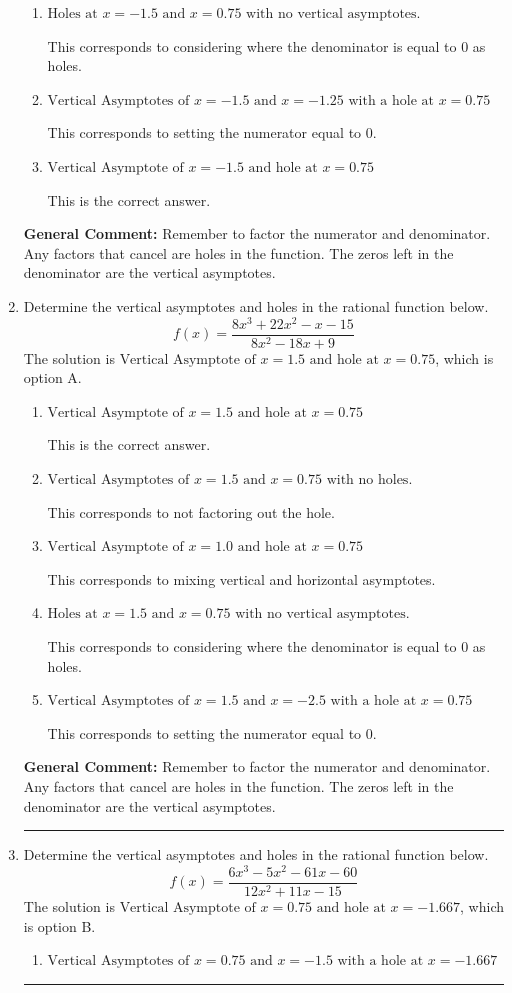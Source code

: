 \documentclass{extbook}[14pt]
\newcommand{\litem}[1]{\item #1

\rule{\textwidth}{0.4pt}}
\begin{document}
\begin{enumerate}
{\begin{enumerate}[label=\Alph*.]
This corresponds to mixing vertical and horizontal asymptotes.
\item \( \text{Holes at } x = -1.5 \text{ and } x = 0.75 \text{ with no vertical asymptotes.} \)

This corresponds to considering where the denominator is equal to 0 as holes.
\item \( \text{Vertical Asymptotes of } x = -1.5 \text{ and } x = -1.25 \text{ with a hole at } x = 0.75 \)

This corresponds to setting the numerator equal to 0.
\item \( \text{Vertical Asymptote of } x = -1.5 \text{ and hole at } x = 0.75 \)

This is the correct answer.
\end{enumerate}

\textbf{General Comment:} Remember to factor the numerator and denominator. Any factors that cancel are holes in the function. The zeros left in the denominator are the vertical asymptotes.
}
\litem{
Determine the vertical asymptotes and holes in the rational function below.
\[ f(x) = \frac{8x^{3} +22 x^{2} -x -15}{8x^{2} -18 x + 9} \]The solution is \( \text{Vertical Asymptote of } x = 1.5 \text{ and hole at } x = 0.75 \), which is option A.\begin{enumerate}[label=\Alph*.]
\item \( \text{Vertical Asymptote of } x = 1.5 \text{ and hole at } x = 0.75 \)

This is the correct answer.
\item \( \text{Vertical Asymptotes of } x = 1.5 \text{ and } x = 0.75 \text{ with no holes.} \)

This corresponds to not factoring out the hole.
\item \( \text{Vertical Asymptote of } x = 1.0 \text{ and hole at } x = 0.75 \)

This corresponds to mixing vertical and horizontal asymptotes.
\item \( \text{Holes at } x = 1.5 \text{ and } x = 0.75 \text{ with no vertical asymptotes.} \)

This corresponds to considering where the denominator is equal to 0 as holes.
\item \( \text{Vertical Asymptotes of } x = 1.5 \text{ and } x = -2.5 \text{ with a hole at } x = 0.75 \)

This corresponds to setting the numerator equal to 0.
\end{enumerate}

\textbf{General Comment:} Remember to factor the numerator and denominator. Any factors that cancel are holes in the function. The zeros left in the denominator are the vertical asymptotes.
}
\litem{
Determine the vertical asymptotes and holes in the rational function below.
\[ f(x) = \frac{6x^{3} -5 x^{2} -61 x -60}{12x^{2} +11 x -15} \]The solution is \( \text{Vertical Asymptote of } x = 0.75 \text{ and hole at } x = -1.667 \), which is option B.\begin{enumerate}[label=\Alph*.]
\item \( \text{Vertical Asymptotes of } x = 0.75 \text{ and } x = -1.5 \text{ with a hole at } x = -1.667 \)


\end{enumerate}}
\end{enumerate}
\end{document}
